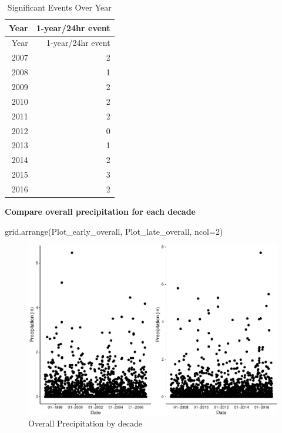 \documentclass[
  12pt,
]{article}
\newenvironment{Shaded}{\begin{snugshade}}{\end{snugshade}}
\newcommand{\AttributeTok}[1]{\textcolor[rgb]{0.77,0.63,0.00}{#1}}
\newcommand{\DecValTok}[1]{\textcolor[rgb]{0.00,0.00,0.81}{#1}}
\newcommand{\FunctionTok}[1]{\textcolor[rgb]{0.00,0.00,0.00}{#1}}
\newcommand{\NormalTok}[1]{#1}
\begin{document}
\begin{longtable}[]{@{}rr@{}}
\caption{Significant Events Over Year}\tabularnewline
\toprule
Year & 1-year/24hr event \\
\midrule
\endfirsthead
\toprule
Year & 1-year/24hr event \\
\midrule
\endhead
2007 & 2 \\
2008 & 1 \\
2009 & 2 \\
2010 & 2 \\
2011 & 2 \\
2012 & 0 \\
2013 & 1 \\
2014 & 2 \\
2015 & 3 \\
2016 & 2 \\
\bottomrule
\end{longtable}

\newpage

\textbf{Compare overall precipitation for each decade}

\begin{Shaded}
\begin{Highlighting}[]
\FunctionTok{grid.arrange}\NormalTok{(Plot\_early\_overall, Plot\_late\_overall, }\AttributeTok{ncol=}\DecValTok{2}\NormalTok{)}
\end{Highlighting}
\end{Shaded}

\begin{figure}

{\centering \includegraphics{Final_Project_Thornton_Katayama_Ngenzi_files/figure-latex/overall grid-1} 

}

\caption{Overall Precipitation by decade}\label{fig:overall grid}
\end{figure}
\newpage
\end{document}
